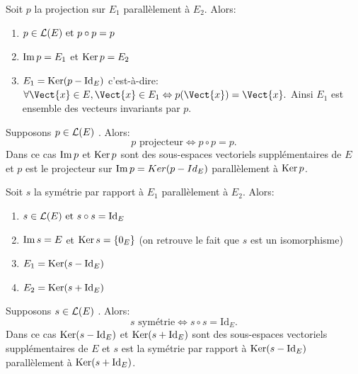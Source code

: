 \documentclass{book}
\begin{document}
\begin{Proposition}[Propriétés] Soit $p$ la projection sur $E_1$ parallèlement à $E_2$. Alors:
\begin{enumerate}
\item $p \in   \mathcal{L}(E)\text{ et }p \circ p = p$
\item $\operatorname{Im} p = E_1$ et $\operatorname{Ker} p = E_2$
\item $E_1 = \operatorname{Ker}(p - \mathrm{Id}_E)$ c'est-à-dire: $\forall   \Vect{x} \in   E,\Vect{ x }\in   E_1 \Leftrightarrow p(\Vect{x}) = \Vect{x}.$ Ainsi $E_1$ est ensemble des vecteurs invariants par $p$.
\end{enumerate}
\end{Proposition}
\begin{Proposition}[Caractérisation] Supposons $p \in   \mathcal{L}(E)$ . Alors:
$$p\text{ projecteur} \Leftrightarrow p \circ p = p.$$
Dans ce cas $\operatorname{Im} p$ et $\operatorname{Ker} p$ sont des sous-espaces vectoriels supplémentaires de $E$ et $p$ est le projecteur sur $\operatorname{Im} p =
Ker(p - Id_E)$ parallèlement à $\operatorname{Ker} p$.
\end{Proposition}
\begin{Proposition}[Propriétés] Soit $s$ la symétrie par rapport à $E_1$ parallèlement à $E_2$. Alors:
\begin{enumerate}
\item $s \in   \mathcal{L}(E)\text{ et }s \circ s = \mathrm{Id}_E$
\item $\operatorname{Im} s = E$ et $\operatorname{Ker} s = \{0_E\}$ (on retrouve le fait que $s$ est un isomorphisme)
\item $E_1 = \operatorname{Ker}(s - \mathrm{Id}_E)$
\item $E_2 = \operatorname{Ker}(s + \mathrm{Id}_E)$
\end{enumerate}
\end{Proposition}
\begin{Proposition}[Caractérisation] Supposons $s \in   \mathcal{L}(E)$ . Alors:
$$s\text{ symétrie} \Leftrightarrow s \circ s = \mathrm{Id}_E.$$
Dans ce cas $\operatorname{Ker}(s - \mathrm{Id}_E)$ et $\operatorname{Ker}(s + \mathrm{Id}_E)$ sont des sous-espaces vectoriels supplémentaires de $E$ et $s$ est la symétrie
par rapport à $\operatorname{Ker}(s - \mathrm{Id}_E)$ parallèlement à $\operatorname{Ker}(s + \mathrm{Id}_E)$.
\end{Proposition}
\end{document}
